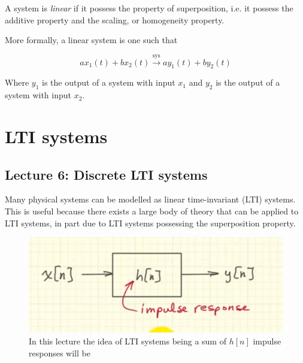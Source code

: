 \documentclass[../notes.tex]{subfiles}
\begin{document}
\begin{definition}
	A system is \textit{linear} if it possess the property of superposition, i.e. it possess the additive property and the scaling, or homogeneity property.

	More formally, a linear system is one such that

	\begin{equation}
		ax_1(t) + bx_2(t) \xrightarrow{\text{sys}} ay_1(t) + by_2(t)
	\end{equation}

	Where $ y_1 $ is the output of a system with input $ x_1 $ and $ y_2 $ is the output of a system with input $ x_2 $.
	
\end{definition}


\section{LTI systems}
\subsection{Lecture 6: Discrete LTI systems}
Many physical systems can be modelled as linear time-invariant (LTI) systems.
This is useful because there exists a large body of theory that can be applied to LTI systems, in part due to LTI systems possessing the superposition property.



\begin{figure}[H]
	\centering
	\includegraphics[width=0.8\linewidth]{img/image_2022-09-25-20-06-00.png}
	\caption{In this lecture the idea of LTI systems being a sum of $ h[n] $ impulse responses will be }
\end{figure}
\end{document}
